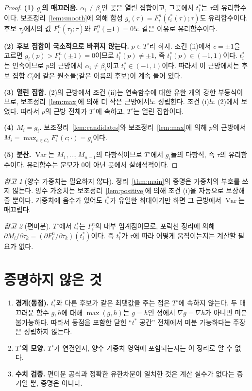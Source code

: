 \documentclass[11pt,a4paper]{article}
\theoremstyle{definition}
\theoremstyle{remark}
\newtheorem{remark}{참고}
\newcommand{\Var}{\operatorname{Var}}
\begin{document}
\begin{proof}
\textbf{(1) $g_i$의 매끄러움.}
$\alpha_i\ne\beta_i$인 곳은 열린 집합이고, 그곳에서 $t^*_i$는 $\tau$의 유리함수이다.
보조정리~\ref{lem:smooth}에 의해 합성 $g_i(\tau)=F_i^n(t^*_i(\tau);\tau)$도 유리함수이다.
후보 $\tau_j$에서의 값 $F_i^n(\tau_j;\tau)$와 $F_i^n(\pm1)=0$도 같은 이유로 유리함수이다.

\textbf{(2) 후보 집합이 국소적으로 바뀌지 않는다.}
$p\in T^\circ$라 하자. 조건 (ii)에서 $c=\pm1$을 고르면 $g_i(p)>F_i^n(\pm1)=0$이므로 $t^*_i(p)\neq\pm1$, 즉 $t^*_i(p)\in(-1,1)$이다.
$t^*_i$는 연속이므로 $p$의 근방에서 $\alpha_i\ne\beta_i$이고 $t^*_i\in(-1,1)$이다.
따라서 이 근방에서는 후보 집합 $C_i$에 같은 원소들(같은 이름의 후보)이 계속 들어 있다.

\textbf{(3) 열린 집합.}
(2)의 근방에서 조건 (ii)는 연속함수에 대한 유한 개의 강한 부등식이므로, 보조정리~\ref{lem:max}에 의해 더 작은 근방에서도 성립한다.
조건 (i)도 (2)에서 보였다. 따라서 $p$의 근방 전체가 $T^\circ$에 속하고, $T^\circ$는 열린 집합이다.

\textbf{(4) $M_i=g_i$.}
보조정리~\ref{lem:candidates}와 보조정리~\ref{lem:max}에 의해 $p$의 근방에서 $M_i=\max_{c\in C_i}F_i^n(c;\cdot)=g_i$이다.

\textbf{(5) 분산.}
$\Var$는 $M_1,\dots,M_{n-1}$의 다항식이므로 $T^\circ$에서 $g_i$들의 다항식, 즉 $\tau$의 유리함수이다.
유리함수는 분모가 0이 아닌 곳에서 실해석적이다.
\end{proof}

\begin{remark}[양수 가중치는 필요하지 않다]
정리~\ref{thm:main}의 증명은 가중치의 부호를 쓰지 않는다.
양수 가중치는 보조정리~\ref{lem:positive}에 의해 조건 (i)을 자동으로 보장해 줄 뿐이다.
가중치에 음수가 있어도 $t^*_i$가 유일한 최대이기만 하면 그 근방에서 $\Var$는 매끄럽다.
\end{remark}

\begin{remark}[편미분]
$T^\circ$에서 $t^*_i$는 $F_i^n$의 내부 임계점이므로, 포락선 정리에 의해
$\partial M_i/\partial\tau_k=(\partial F_i^n/\partial\tau_k)(t^*_i)$이다.
즉 $t^*_i$가 $\tau$에 따라 어떻게 움직이는지는 계산할 필요가 없다.
\end{remark}

\section{증명하지 않은 것}

\begin{enumerate}[leftmargin=*]
\item \textbf{경계(동점).} $t^*_i$와 다른 후보가 같은 최댓값을 주는 점은 $T^\circ$에 속하지 않는다.
두 매끄러운 함수 $g,h$에 대해 $\max(g,h)$는 $g=h$인 점에서 $\nabla g=\nabla h$가 아니면 미분 불가능하다.
따라서 동점을 포함한 닫힌 ``$t^*$ 공간'' 전체에서 미분 가능하다는 주장은 성립하지 않는다.
\item \textbf{$T^\circ$의 모양.} $T^\circ$가 연결인지, 양수 가중치 영역에 포함되는지는 이 정리로 알 수 없다.
\item \textbf{수치 검증.} 편미분 공식과 정확한 유한차분이 일치한 것은 계산 실수가 없다는 증거일 뿐, 증명은 아니다.
\end{enumerate}
\end{document}
